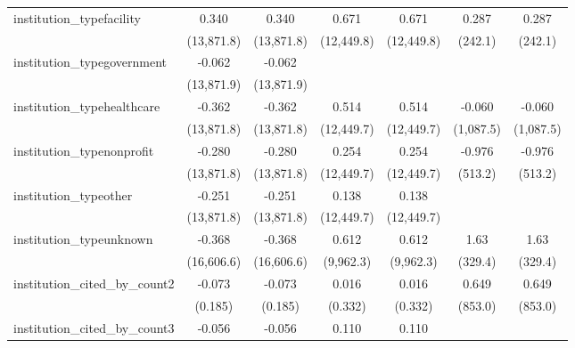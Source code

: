 \begin{tabular}{lcccccc}
   institution\_typefacility             & 0.340         & 0.340         & 0.671         & 0.671         & 0.287          & 0.287\\   
                                         & (13,871.8)    & (13,871.8)    & (12,449.8)    & (12,449.8)    & (242.1)        & (242.1)\\   
   institution\_typegovernment           & -0.062        & -0.062        &               &               &                &   \\   
                                         & (13,871.9)    & (13,871.9)    &               &               &                &   \\   
   institution\_typehealthcare           & -0.362        & -0.362        & 0.514         & 0.514         & -0.060         & -0.060\\   
                                         & (13,871.8)    & (13,871.8)    & (12,449.7)    & (12,449.7)    & (1,087.5)      & (1,087.5)\\   
   institution\_typenonprofit            & -0.280        & -0.280        & 0.254         & 0.254         & -0.976         & -0.976\\   
                                         & (13,871.8)    & (13,871.8)    & (12,449.7)    & (12,449.7)    & (513.2)        & (513.2)\\   
   institution\_typeother                & -0.251        & -0.251        & 0.138         & 0.138         &                &   \\   
                                         & (13,871.8)    & (13,871.8)    & (12,449.7)    & (12,449.7)    &                &   \\   
   institution\_typeunknown              & -0.368        & -0.368        & 0.612         & 0.612         & 1.63           & 1.63\\   
                                         & (16,606.6)    & (16,606.6)    & (9,962.3)     & (9,962.3)     & (329.4)        & (329.4)\\   
   institution\_cited\_by\_count2        & -0.073        & -0.073        & 0.016         & 0.016         & 0.649          & 0.649\\   
                                         & (0.185)       & (0.185)       & (0.332)       & (0.332)       & (853.0)        & (853.0)\\   
   institution\_cited\_by\_count3        & -0.056        & -0.056        & 0.110         & 0.110         &                &   \\   

\end{tabular}
